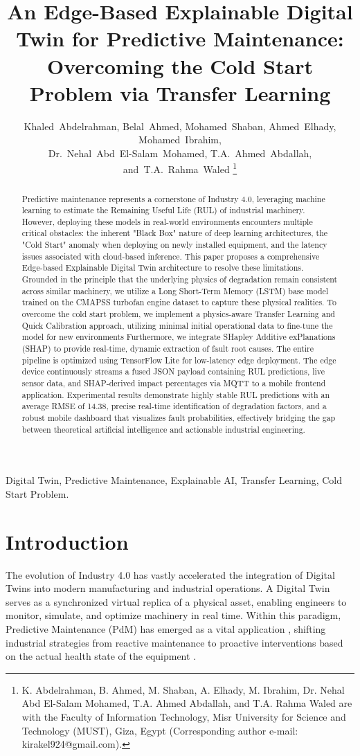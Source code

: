 \documentclass[journal]{IEEEtran}
\title{An Edge-Based Explainable Digital Twin for Predictive Maintenance: Overcoming the Cold Start Problem via Transfer Learning}
\author{Khaled~Abdelrahman, Belal~Ahmed, Mohamed~Shaban, Ahmed~Elhady, Mohamed~Ibrahim, \\
Dr.~Nehal~Abd~El-Salam~Mohamed, T.A.~Ahmed~Abdallah, and~T.A.~Rahma~Waled%
\thanks{K. Abdelrahman, B. Ahmed, M. Shaban, A. Elhady, M. Ibrahim, Dr. Nehal Abd El-Salam Mohamed, T.A. Ahmed Abdallah, and T.A. Rahma Waled are with the Faculty of Information Technology, Misr University for Science and Technology (MUST), Giza, Egypt (Corresponding author e-mail: kirakel924@gmail.com).}}
\begin{document}
\maketitle

\begin{abstract}
Predictive maintenance represents a cornerstone of Industry 4.0, leveraging machine learning to estimate the Remaining Useful Life (RUL) of industrial machinery. However, deploying these models in real-world environments encounters multiple critical obstacles: the inherent "Black Box" nature of deep learning architectures, the "Cold Start" anomaly when deploying on newly installed equipment, and the latency issues associated with cloud-based inference. This paper proposes a comprehensive Edge-based Explainable Digital Twin architecture to resolve these limitations. Grounded in the principle that the underlying physics of degradation remain consistent across similar machinery, we utilize a Long Short-Term Memory (LSTM) base model trained on the CMAPSS turbofan engine dataset to capture these physical realities. To overcome the cold start problem, we implement a physics-aware Transfer Learning and Quick Calibration approach, utilizing minimal initial operational data to fine-tune the model for new environments
Furthermore, we integrate SHapley Additive exPlanations (SHAP) to provide real-time, dynamic extraction of fault root causes. The entire pipeline is optimized using TensorFlow Lite for low-latency edge deployment. The edge device continuously streams a fused JSON payload containing RUL predictions, live sensor data, and SHAP-derived impact percentages via MQTT to a mobile frontend application. Experimental results demonstrate highly stable RUL predictions with an average RMSE of 14.38, precise real-time identification of degradation factors, and a robust mobile dashboard that visualizes fault probabilities, effectively bridging the gap between theoretical artificial intelligence and actionable industrial engineering.
\end{abstract}

\begin{IEEEkeywords}
Digital Twin, Predictive Maintenance, Explainable AI, Transfer Learning, Cold Start Problem.
\end{IEEEkeywords}

\section{Introduction}
The evolution of Industry 4.0 has vastly accelerated the integration of Digital Twins into modern manufacturing and industrial operations. A Digital Twin serves as a synchronized virtual replica of a physical asset, enabling engineers to monitor, simulate, and optimize machinery in real time. Within this paradigm, Predictive Maintenance (PdM) has emerged as a vital application , shifting industrial strategies from reactive maintenance to proactive interventions based on the actual health state of the equipment \cite{serradilla2020}.
\end{document}
